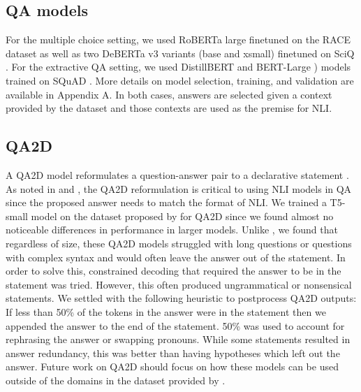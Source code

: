 \documentclass[11pt]{article}
\begin{document}
\subsection{QA models}
For the multiple choice setting, we used RoBERTa large \citep{liu_roberta_2019} finetuned on the RACE dataset \citep{lai_race_2017} as well as two DeBERTa v3 \citep{he_debertav3_2021} variants (base and xsmall) finetuned on SciQ \citep{welbl_crowdsourcing_2017}. For the extractive QA setting, we used DistillBERT \citep{sanh_distilbert_2020} and BERT-Large \citep{devlin_bert_2019}) models trained on SQuAD \citep{rajpurkar_squad_2016}. More details on model selection, training, and validation are available in Appendix A. In both cases, answers are selected given a context provided by the dataset and those contexts are used as the premise for NLI.
\subsection{QA2D}
A QA2D model reformulates a question-answer pair to a declarative statement \citep{demszky_transforming_2018}. As noted in \citet{chen_can_2021} and \citet{mishra_looking_2021}, the QA2D reformulation is critical to using NLI models in QA since the proposed answer needs to match the format of NLI. We trained a T5-small model \citep{raffel_exploring_2020} on the dataset proposed by \citet{demszky_transforming_2018} for QA2D since we found almost no noticeable differences in performance in larger models. Unlike \citet{chen_can_2021}, we found that regardless of size, these QA2D models struggled with long questions or questions with complex syntax and would often leave the answer out of the statement. In order to solve this, constrained decoding that required the answer to be in the statement was tried. However, this often produced ungrammatical or nonsensical statements. We settled with the following heuristic to postprocess QA2D outputs: If less than 50\% of the tokens in the answer were in the statement then we appended the answer to the end of the statement. 50\% was used to account for rephrasing the answer or swapping pronouns. While some statements resulted in answer redundancy, this was better than having hypotheses which left out the answer. Future work on QA2D should focus on how these models can be used outside of the domains in the dataset provided by \citet{demszky_transforming_2018}.
\end{document}
